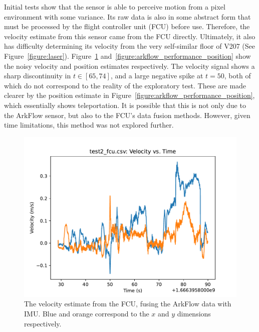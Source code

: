 Initial tests show that the sensor is able to perceive motion from a pixel environment
with some variance.
Its raw data is also in some abstract form that must be processed by the flight controller unit (FCU)
before use.
Therefore, the velocity estimate from this sensor came from the FCU directly.
Ultimately, it also has difficulty determining its velocity from the very self-similar floor of V207
(See Figure~\ref{figure:laser}).
Figure~\ref{figure:arkflow_performance_velocity} and~\ref{figure:arkflow_performance_position} show
the noisy velocity and position estimates respectively.
The velocity signal shows a sharp discontinuity in $t\in[65, 74]$,
and a large negative spike at $t=50$,
both of which do not correspond to the reality of the exploratory test.
These are made clearer by the position estimate in Figure~\ref{figure:arkflow_performance_position},
which essentially shows teleportation.
It is possible that this is not only due to the ArkFlow sensor, but also to the FCU's data fusion methods.
However, given time limitations, this method was not explored further.

\begin{figure}
	\centering
	\includegraphics[width=\linewidth]{./images/test2_fcu_velocity}
	\caption{The velocity estimate from the FCU, fusing the ArkFlow data with IMU. Blue and orange correspond to the $x$ and $y$ dimensions respectively.}
	\label{figure:arkflow_performance_velocity}
\end{figure}

